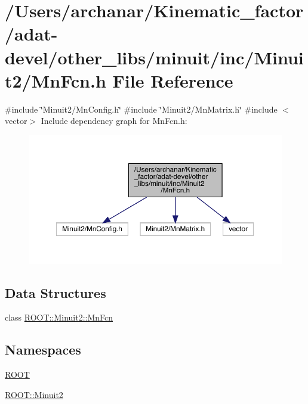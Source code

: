 \hypertarget{adat-devel_2other__libs_2minuit_2inc_2Minuit2_2MnFcn_8h}{}\section{/\+Users/archanar/\+Kinematic\+\_\+factor/adat-\/devel/other\+\_\+libs/minuit/inc/\+Minuit2/\+Mn\+Fcn.h File Reference}
\label{adat-devel_2other__libs_2minuit_2inc_2Minuit2_2MnFcn_8h}
{\ttfamily \#include \char`\"{}Minuit2/\+Mn\+Config.\+h\char`\"{}}\newline
{\ttfamily \#include \char`\"{}Minuit2/\+Mn\+Matrix.\+h\char`\"{}}\newline
{\ttfamily \#include $<$vector$>$}\newline
Include dependency graph for Mn\+Fcn.\+h\+:
\nopagebreak
\begin{figure}[H]
\begin{center}
\leavevmode
\includegraphics[width=350pt]{dc/d72/adat-devel_2other__libs_2minuit_2inc_2Minuit2_2MnFcn_8h__incl}
\end{center}
\end{figure}
\subsection*{Data Structures}
\begin{DoxyCompactItemize}
\item 
class \mbox{\hyperlink{classROOT_1_1Minuit2_1_1MnFcn}{R\+O\+O\+T\+::\+Minuit2\+::\+Mn\+Fcn}}
\end{DoxyCompactItemize}
\subsection*{Namespaces}
\begin{DoxyCompactItemize}
\item 
 \mbox{\hyperlink{namespaceROOT}{R\+O\+OT}}
\item 
 \mbox{\hyperlink{namespaceROOT_1_1Minuit2}{R\+O\+O\+T\+::\+Minuit2}}
\end{DoxyCompactItemize}
